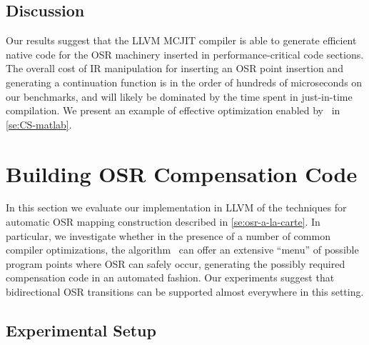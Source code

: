
\subsection{Discussion}
Our results suggest that the LLVM MCJIT compiler is able to generate efficient native code for the OSR machinery inserted in performance-critical code sections. The overall cost of IR manipulation for inserting an OSR point insertion and generating a continuation function is in the order of hundreds of microseconds on our benchmarks, and will likely be dominated by the time spent in just-in-time compilation. We present an example of effective optimization enabled by \osrkit\ in \mysection\ref{se:CS-matlab}. 



\section{Building OSR Compensation Code}
\label{se:eval-OSR-alC}

In this section we evaluate our implementation in LLVM of the techniques for automatic OSR mapping construction described in \mysection\ref{se:osr-a-la-carte}. In particular, we investigate whether in the presence of a number of common compiler optimizations, the algorithm \buildcomp\ can offer an extensive ``menu'' of possible program points where OSR can safely occur, generating the possibly required compensation code in an automated fashion. Our experiments suggest that bidirectional OSR transitions can be supported almost everywhere in this setting.

\subsection{Experimental Setup}
\label{ss:bc-exp-setup}

